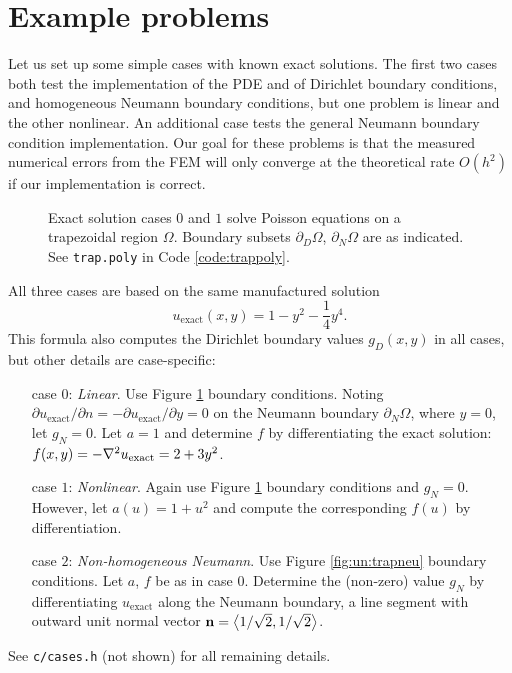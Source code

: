\section{Example problems}

Let us set up some simple cases with known exact solutions.  The first two cases both test the implementation of the PDE and of Dirichlet boundary conditions, and homogeneous Neumann boundary conditions, but one problem is linear and the other nonlinear.  An additional case tests the general Neumann boundary condition implementation.  Our goal for these problems is that the measured numerical errors from the FEM will only converge at the theoretical rate $O(h^2)$ if our implementation is correct.

\begin{figure}

\caption{Exact solution cases $0$ and $1$ solve Poisson equations on a trapezoidal region $\Omega$.  Boundary subsets $\partial_D\Omega$, $\partial_N \Omega$ are as indicated.  See \texttt{trap.poly} in Code \ref{code:trappoly}.}
\label{fig:un:trap}
\end{figure}

All three cases are based on the same manufactured solution
\begin{equation}
  u_{\text{exact}}(x,y) = 1 - y^2 - \frac{1}{4} y^4. \label{eq:un:exactsolution}
\end{equation}
This formula also computes the Dirichlet boundary values $g_D(x,y)$ in all cases, but other details are case-specific:
\begin{itemize}
\item[case $0$:] \emph{Linear}.  Use Figure \ref{fig:un:trap} boundary conditions.  Noting $\partial u_{\text{exact}}/\partial n = -\partial u_{\text{exact}}/\partial y = 0$ on the Neumann boundary $\partial_N \Omega$, where $y=0$, let $g_N=0$.  Let $a=1$ and determine $f$ by differentiating the exact solution: $f(x,y) = -\nabla^2 u_{\text{exact}} = 2 + 3 y^2$.
\item[case $1$:] \emph{Nonlinear}.  Again use Figure \ref{fig:un:trap} boundary conditions and $g_N=0$.  However, let $a(u) = 1+u^2$ and compute the corresponding $f(u)$ by differentiation.
\item[case $2$:] \emph{Non-homogeneous Neumann}.  Use Figure \ref{fig:un:trapneu} boundary conditions.  Let $a$, $f$ be as in case $0$.  Determine the (non-zero) value $g_N$ by differentiating $u_{\text{exact}}$ along the Neumann boundary, a line segment with outward unit normal vector $\mathbf{n} = \left<1/\sqrt{2},1/\sqrt{2}\right>$.
\end{itemize}
See \texttt{c/\CODELOC cases.h} (not shown) for all remaining details.

